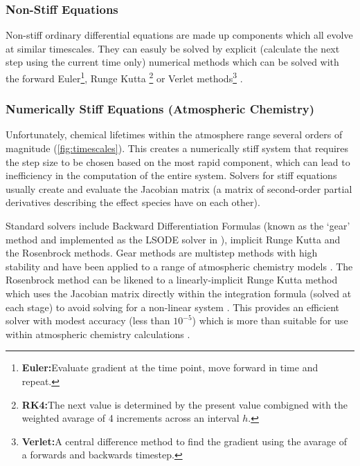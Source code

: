 \subsubsection{Non-Stiff Equations}
Non-stiff ordinary differential equations are made up components which all evolve at similar timescales. They can easuly be solved by explicit (calculate the next step using the current time only) numerical methods which can be solved with the forward Euler\footnote{\textbf{Euler:}Evaluate gradient at the time point, move forward in time and repeat.}, Runge Kutta \footnote{\textbf{RK4:}The next value is determined by the present value combigned with the weighted avarage of 4 increments across an interval $h$.} or Verlet methods\footnote{\textbf{Verlet:}A central difference method to find the gradient using the avarage of a forwards and backwards timestep.} \citep{advnummeth,wild}.
\subsubsection{Numerically Stiff Equations (Atmospheric Chemistry)}
Unfortunately, chemical lifetimes within the atmosphere range several orders of magnitude (\autoref{fig:timescales}). This creates a numerically stiff system that requires the step size to be chosen based on the most rapid component, which can lead to inefficiency in the computation of the entire system. Solvers for stiff equations usually create and evaluate the Jacobian matrix (a matrix of second-order partial derivatives describing the effect species have on each other).

Standard solvers include Backward Differentiation Formulas (known as the `gear' method and implemented as the LSODE solver in \citep{kpp}),  implicit Runge Kutta and the Rosenbrock methods. Gear methods are multistep methods with high stability and have been applied to a range of atmospheric chemistry models \citep{gear, geos, fundamentals}.
The Rosenbrock method can be likened to a linearly-implicit Runge Kutta method which uses the Jacobian matrix directly within the integration formula (solved at each stage) to avoid solving for a non-linear system \citep{solvers}. This provides an efficient solver with modest accuracy (less than $10^{-5}$) which is more than suitable for use within atmospheric chemistry calculations \citep{solvers,rosenbrock}.


